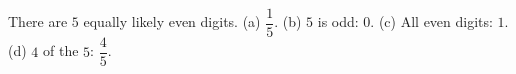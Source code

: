 There are $5$ equally likely even digits. (a) $\boxed{\dfrac15}$. (b) $5$ is odd: $\boxed{0}$. (c) All even digits: $\boxed{1}$. (d) $4$ of the $5$: $\boxed{\dfrac45}$.
